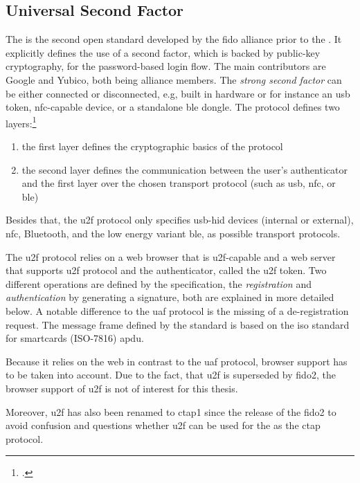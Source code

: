 \subsection{Universal Second Factor}

The  is the second open standard developed by the \gls{fido} alliance prior to the \wa. It explicitly defines the use of a second factor, which is backed by public-key cryptography, for the password-based login flow. The main contributors are Google and Yubico, both being alliance members. The \textit{strong second factor} can be either connected or disconnected, e.g, built in hardware or for instance an \gls{usb} token, \gls{nfc}-capable device, or a standalone \gls{ble} dongle. The protocol defines two layers:\footcites[See][4]{u2f-overview}

\begin{enumerate}
	\item the first layer defines the cryptographic basics of the protocol
	\item the second layer defines the communication between the user's authenticator and the first layer over the chosen transport protocol (such as \gls{usb}, \gls{nfc}, or \gls{ble})
\end{enumerate}

Besides that, the \gls{u2f} protocol only specifies \gls{usb}-\gls{hid} devices (internal or external), \gls{nfc}, Bluetooth, and the low energy variant \gls{ble}, as possible transport protocols.

The \gls{u2f} protocol relies on a web browser that is \gls{u2f}-capable and a web server that supports \gls{u2f} protocol and the authenticator, called the \gls{u2f} token. Two different operations are defined by the specification, the \textit{registration} and \textit{authentication} by generating a signature, both are explained in more detailed below. A notable difference to the \gls{uaf} protocol is the missing of a de-registration request. The message frame defined by the standard is based on the \gls{iso} standard for smartcards (ISO-7816) \gls{apdu}.

Because it relies on the web in contrast to the \gls{uaf} protocol, browser support has to be taken into account. Due to the fact, that \gls{u2f} is superseded by \gls{fido}2, the browser support of \gls{u2f} is not of interest for this thesis.

Moreover, \gls{u2f} has also been renamed to \gls{ctap}1 since the release of the \gls{fido}2 to avoid confusion and questions whether \gls{u2f} can be used for the \wa{} as the \gls{ctap} protocol.

